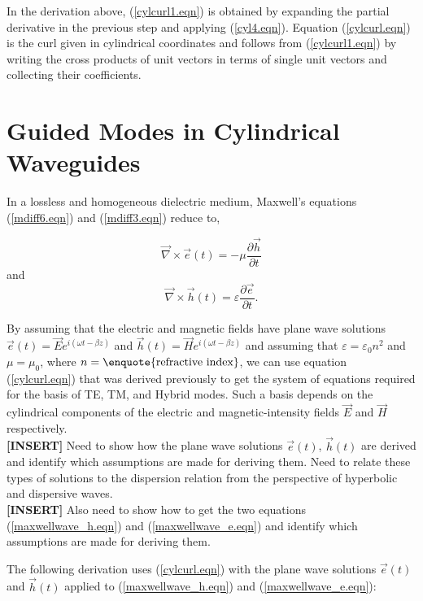 \documentclass[12pt]{article}
\theoremstyle{definition}
\numberwithin{equation}{section}
\begin{document}
\vspace{8mm}In the derivation above, (\ref{cylcurl1.eqn}) is obtained by expanding the partial derivative in the previous step and applying (\ref{cyl4.eqn}). Equation (\ref{cylcurl.eqn}) is the curl given in cylindrical coordinates and follows from (\ref{cylcurl1.eqn}) by writing the cross products of unit vectors in terms of single unit vectors and collecting their coefficients.

\section{Guided Modes in Cylindrical Waveguides}

In a lossless and homogeneous dielectric medium, Maxwell's equations (\ref{mdiff6.eqn}) and (\ref{mdiff3.eqn}) reduce to,

\begin{equation}
\vec{\nabla}\times\vec{e}(t)=-\mu\frac{\partial\vec{h}}{\partial t}
\label{maxwellwave_e.eqn}
\end{equation}
and
\begin{equation}
\vec{\nabla}\times\vec{h}(t)=\varepsilon\frac{\partial\vec{e}}{\partial t}.
\label{maxwellwave_h.eqn}
\end{equation}

By assuming that the electric and magnetic fields have plane wave solutions $\vec{e}(t)=\vec{E}e^{i(\omega t-\beta z)}$ and $\vec{h}(t)=\vec{H}e^{i(\omega t-\beta z)}$  and assuming that $\varepsilon=\varepsilon_{0}n^{2}$ and $\mu=\mu_{0}$, where $n=\text{\enquote{refractive index}}$, we can use equation (\ref{cylcurl.eqn}) that was derived previously to get the system of equations required for the basis of TE, TM, and Hybrid modes. Such a basis depends on the cylindrical components of the electric and magnetic-intensity fields $\vec{E}$ and $\vec{H}$ respectively.\\

{\bf [INSERT]} Need to show how the plane wave solutions $\vec{e}(t)$, $\vec{h}(t)$ are derived and identify which assumptions are made for deriving them. Need to relate these types of solutions to the dispersion relation from the perspective of hyperbolic and dispersive waves.\\
{\bf [INSERT]} Also need to show how to get the two equations (\ref{maxwellwave_h.eqn}) and (\ref{maxwellwave_e.eqn}) and identify which assumptions are made for deriving them.

The following derivation uses (\ref{cylcurl.eqn}) with the plane wave solutions $\vec{e}(t)$ and $\vec{h}(t)$ applied to (\ref{maxwellwave_h.eqn}) and (\ref{maxwellwave_e.eqn}):
\end{document}
